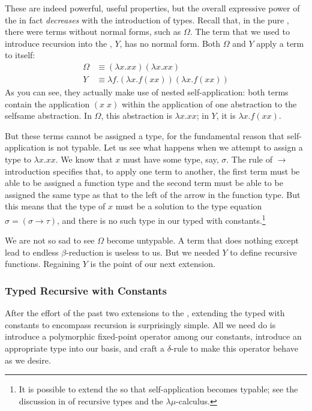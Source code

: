 These are indeed powerful, useful properties, but the overall expressive power of the \lambdacalc in fact \emph{decreases} with the introduction of types. Recall that, in the pure \lambdacalc{}, there were terms without normal forms, such as $\Omega$. The term that we used to introduce recursion into the \lambdacalc{}, $Y$, has no normal form. Both $\Omega$ and $Y$ apply a term to itself:
\begin{align*}
\Omega &\equiv (\lambda x.xx)(\lambda x.xx)\\
Y &\equiv \lambda f.(\lambda x. f (x x))(\lambda x. f (x x))
\end{align*}
As you can see, they actually make use of nested self-application: both terms contain the application $(x\; x)$ within the application of one abstraction to the selfsame abstraction. In $\Omega$, this abstraction is $\lambda x. xx$; in $Y$, it is $\lambda x. f (x x)$.

But these terms cannot be assigned a type, for the fundamental reason that self-application is not typable. Let us see what happens when we attempt to assign a type to $\lambda x. x x$. We know that $x$ must have some type, say, $\sigma$. The rule of $\to$ introduction specifies that, to apply one term to another, the first term must be able to be assigned a function type and the second term must be able to be assigned the same type as that to the left of the arrow in the function type. But this means that the type of $x$ must be a solution to the type equation $\sigma = (\sigma \to \tau)$, and there is no such type in our typed \lambdacalc with constants.\footnote{It is possible to extend the \lambdacalc so that self-application becomes typable; see the discussion in \citet[\mbox{Section 3.2, pp. 14--17}]{Barendregt:Types:1990} of recursive types and the $\lambda \mu$-calculus.}

We are not so sad to see $\Omega$ become untypable. A term that does nothing except lead to endless $\beta$-reduction is useless to us. But we needed $Y$ to define recursive functions. Regaining $Y$ is the point of our next extension.

\subsubsection{Typed Recursive \LambdaCalc with Constants}
After the effort of the past two extensions to the \lambdacalc, extending the typed \lambdacalc with constants to encompass recursion is surprisingly simple. All we need do is introduce a polymorphic fixed-point operator among our constants, introduce an appropriate type into our basis, and craft a $\delta$-rule to make this operator behave as we desire.

